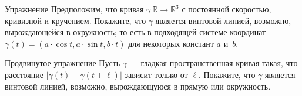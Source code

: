 \begin{thm}{Упражнение}\label{ex:cur+tor=helix}
Предположим, что кривая $\gamma\:\mathbb{R}\to\mathbb{R}^3$ с постоянной скоростью, кривизной и кручением.
Покажите, что $\gamma$ является винтовой линией, возможно, вырождающейся в окружность;
то есть в подходящей системе координат 
$\gamma(t)=(a\cdot \cos t,a\cdot\sin t, b\cdot t)$
для некоторых констант $a$ и~$b$.
\end{thm}


\begin{thm}{Продвинутое упражнение}\label{ex:const-dist}
Пусть $\gamma$ --- гладкая пространственная кривая такая, что расстояние $|\gamma(t)-\gamma(t+\ell)|$ зависит только от $\ell$.
Покажите, что $\gamma$ является винтовой линией, возможно, вырождающуюся в прямую или окружность.
\end{thm}




